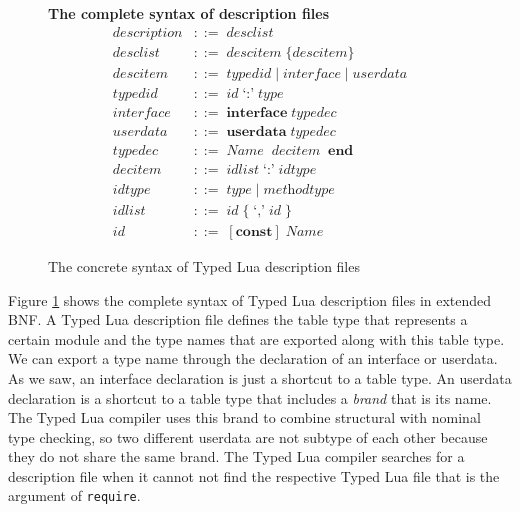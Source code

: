 \begin{figure}[!ht]
\textbf{The complete syntax of description files}\\
\dstart
\begin{align*}
\textit{description} & ::= \; \textit{desclist}\\
\textit{desclist} & ::= \; \textit{descitem} \; \{ \textit{descitem} \}\\
\textit{descitem} & ::= \; \textit{typedid} \; | \;
  \textit{interface} \; | \;
  \textit{userdata}\\
\textit{typedid} & ::= \; \textit{id} \; \texttt{`:'} \; \textit{type}\\ 
\textit{interface} & ::= \; \textbf{interface} \; \textit{typedec}\\
\textit{userdata} & ::= \; \textbf{userdata} \; \textit{typedec}\\
\textit{typedec} & ::= \; \textit{Name} \; { \; \textit{decitem} \; } \; \textbf{end}\\
\textit{decitem} & ::= \; \textit{idlist} \; \texttt{`:'} \; \textit{idtype}\\
\textit{idtype} & ::= \; \textit{type} \; | \; \textit{methodtype}\\
\textit{idlist} & ::= \; \textit{id} \; \{ \; \texttt{`,'} \; \textit{id} \; \}\\
\textit{id} & ::= \; [\textbf{const}] \; \textit{Name}
\end{align*}
\dend
\caption{The concrete syntax of Typed Lua description files}
\label{fig:tldsyntax}
\end{figure}

Figure \ref{fig:tldsyntax} shows the complete syntax of Typed Lua
description files in extended BNF.
A Typed Lua description file defines the table type that represents
a certain module and the type names that are exported
along with this table type.
We can export a type name through the declaration of an interface or
userdata.
As we saw, an interface declaration is just a shortcut to a table type.
An userdata declaration is a shortcut to a table type that includes
a \emph{brand} that is its name.
The Typed Lua compiler uses this brand to combine structural with
nominal type checking, so two different userdata are not subtype
of each other because they do not share the same brand.
The Typed Lua compiler searches for a description file when it cannot
not find the respective Typed Lua file that is the argument of
\texttt{require}.

